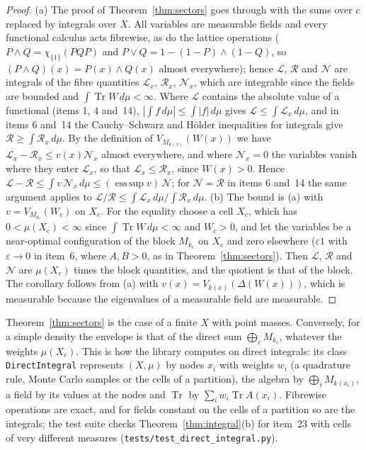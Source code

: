 \documentclass[11pt]{article}
\DeclareMathOperator{\Tr}{Tr}
\newcommand{\cL}{\mathcal{L}}
\newcommand{\cR}{\mathcal{R}}
\newcommand{\cN}{\mathcal{N}}
\theoremstyle{plain}
\theoremstyle{definition}
\theoremstyle{remark}
\begin{document}
\begin{proof}
(a) The proof of Theorem~\ref{thm:sectors} goes through with the sums over $c$ replaced by integrals over $X$. All
variables are measurable fields and every functional calculus acts fibrewise, as do the lattice operations ($P\wedge
Q=\chi_{\{1\}}(PQP)$ and $P\vee Q=1-(1-P)\wedge(1-Q)$, so $(P\wedge Q)(x)=P(x)\wedge Q(x)$ almost everywhere); hence
$\cL$, $\cR$ and $\cN$ are integrals of
the fibre quantities $\cL_x$, $\cR_x$, $\cN_x$, which are integrable since the fields are bounded and
$\int\Tr W\,d\mu<\infty$. Where $\cL$ contains the absolute value of a functional (items 1, 4 and~14),
$|\int f\,d\mu|\le\int|f|\,d\mu$ gives $\cL\le\int\cL_x\,d\mu$, and in items 6 and~14 the Cauchy--Schwarz and Hölder
inequalities for integrals give $\cR\ge\int\cR_x\,d\mu$. By the definition of $V_{M_{k(x)}}(W(x))$ we have
$\cL_x-\cR_x\le v(x)\cN_x$ almost everywhere, and where $\cN_x=0$ the variables vanish where they enter $\cL_x$, so that
$\cL_x\le\cR_x$, since $W(x)>0$. Hence $\cL-\cR\le\int v\,\cN_x\,d\mu\le(\operatorname{ess\,sup}v)\,\cN$; for $\cN=\cR$ in items
6 and~14 the same argument applies to $\cL/\cR\le\int\cL_x\,d\mu/\int\cR_x\,d\mu$. (b) The bound is (a) with $v=V_{M_{k_c}}
(W_c)$ on $X_c$. For the equality choose a cell $X_c$, which has $0<\mu(X_c)<\infty$ since $\int\Tr W\,d\mu<\infty$
and $W_c>0$, and let the variables be a near-optimal configuration of the block $M_{k_c}$ on $X_c$ and zero elsewhere
($\varepsilon1$ with $\varepsilon\to0$ in item~6, where $A,B>0$, as in Theorem~\ref{thm:sectors}). Then $\cL$, $\cR$ and
$\cN$ are $\mu(X_c)$ times the block quantities, and the quotient is that of the block. The
corollary follows from (a) with $v(x)=V_{k(x)}(\Delta(W(x)))$, which is measurable because the eigenvalues of a measurable
field are measurable.
\end{proof}

\noindent Theorem~\ref{thm:sectors} is the case of a finite $X$ with point masses. Conversely, for a simple density the
envelope is that of the direct sum $\bigoplus_cM_{k_c}$, whatever the weights $\mu(X_c)$. This is how the library
computes on direct integrals: its class \texttt{DirectIntegral} represents $(X,\mu)$ by nodes $x_i$ with weights $w_i$ (a
quadrature rule, Monte Carlo samples or the cells of a partition), the algebra by $\bigoplus_iM_{k(x_i)}$, a field by its
values at the nodes and $\Tr$ by $\sum_iw_i\Tr A(x_i)$. Fibrewise operations are exact, and for fields constant on the
cells of a partition so are the integrals; the test suite checks Theorem~\ref{thm:integral}(b) for item~23 with cells of very different measures
(\texttt{tests/test\_direct\_integral.py}).
\end{document}
